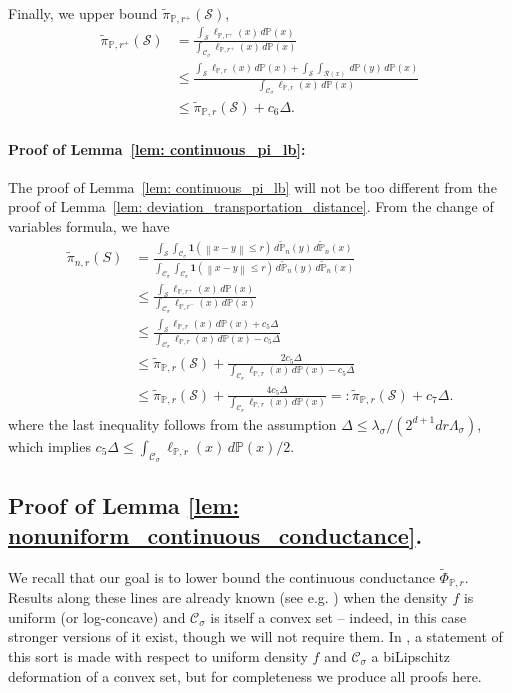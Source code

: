 \documentclass[11pt,twoside]{article}
\newcommand{\norm}[1]{\left\lVert#1\right\rVert}
\newcommand{\1}{\mathbf{1}}
\newcommand{\Pbb}{\mathbb{P}}
\newcommand{\Sset}{\mathcal{S}}
\newcommand{\Cset}{\mathcal{C}}
\newcommand{\Csig}{\Cset_{\sigma}}
\begin{document}
Finally, we upper bound $\widetilde{\pi}_{\Pbb,r^{+}}(\Sset)$,
\begin{align*}
\widetilde{\pi}_{\Pbb,r^{+}}(\Sset) & = \frac{\int_{\Sset} \ell_{\Pbb,r^+}(x) \,d\Pbb(x)}{\int_{\Csig} \ell_{\Pbb,r^+}(x) \,d\Pbb(x)} \\
& \leq \frac{\int_{\Sset} \ell_{\Pbb,r}(x) \,d\Pbb(x) + \int_{\Sset} \int_{\mathcal{R}(x)} \,d\Pbb(y) \,d\Pbb(x)}{\int_{\Csig} \ell_{\Pbb,r}(x) \,d\Pbb(x)} \\
& \leq \widetilde{\pi}_{\Pbb,r}(\Sset) + c_6\varDelta.
\end{align*}

\paragraph{Proof of Lemma~\ref{lem: continuous_pi_lb}: }
The proof of Lemma~\ref{lem: continuous_pi_lb} will not be too different from the proof of Lemma~\ref{lem: deviation_transportation_distance}. From the change of variables formula, we have
\begin{align*}
\widetilde{\pi}_{n,r}(S) & = \frac{\int_{\Sset}\int_{\Csig} \1(\norm{x - y} \leq r) \,d\widetilde{\Pbb}_n(y) \,d\widetilde{\Pbb}_n(x)}{\int_{\Csig}\int_{\Csig} \1(\norm{x - y} \leq r) \,d\widetilde{\Pbb}_n(y) \,d\widetilde{\Pbb}_n(x)} \\
& \leq \frac{\int_{\Sset} \ell_{\Pbb,r^+}(x) \,d\Pbb(x) }{\int_{\Csig}\ell_{\Pbb,r^-}(x) \,d\Pbb(x)} \\
& \leq \frac{\int_{\Sset} \ell_{\Pbb,r}(x) \,d\Pbb(x) + c_5\varDelta}{\int_{\Csig} \ell_{\Pbb,r}(x) \,d\Pbb(x) - c_5\varDelta} \\
& \leq \widetilde{\pi}_{\Pbb,r}(\Sset) + \frac{2c_5\varDelta}{\int_{\Csig} \ell_{\Pbb,r}(x) \,d\Pbb(x) - c_5\varDelta} \\
& \leq \widetilde{\pi}_{\Pbb,r}(\Sset) + \frac{4c_5\varDelta}{\int_{\Csig} \ell_{\Pbb,r}(x) \,d\Pbb(x)} =: \widetilde{\pi}_{\Pbb,r}(\Sset) + c_7 \varDelta.
\end{align*}
where the last inequality follows from the assumption $\varDelta \leq \lambda_{\sigma}/(2^{d + 1} dr\Lambda_{\sigma})$, which implies $c_5\varDelta \leq \int_{\Csig}\ell_{\Pbb,r}(x) \,d\Pbb(x) / 2$.

\subsection{Proof of Lemma \ref{lem: nonuniform_continuous_conductance}. }
We recall that our goal is to lower bound the continuous conductance $\widetilde{\Phi}_{\Pbb,r}$. Results along these lines are already known (see e.g. \cite{kannan04}) when the density $f$ is uniform (or log-concave) and $\Csig$ is itself a convex set -- indeed, in this case stronger versions of it exist, though we will not require them. In \cite{abbasi-yadkori2016a}, a statement of this sort is made with respect to uniform density $f$ and $\Csig$ a biLipschitz deformation of a convex set, but for completeness we produce all proofs here.
\end{document}
